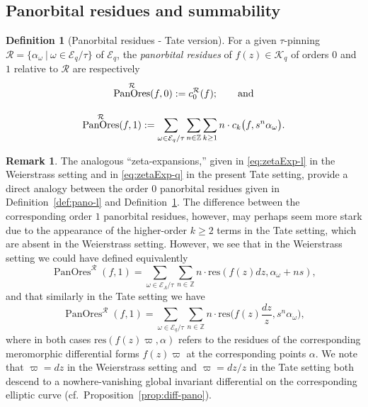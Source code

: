 \documentclass[preprint,12pt]{elsarticle}
\numberwithin{equation}{section} %
\theoremstyle{theorem}
\theoremstyle{definition}
\newtheorem{definition}[theorem]{Definition}
\newtheorem{remark}[theorem]{Remark}
\newcommand{\bk}{\mathcal{K}} %
\newcommand{\bkq}{\bk_{q}} %
\newcommand{\ec}{\mathcal{E}} %
\newcommand{\ecl}{\ec_{\Lambda}} %
\newcommand{\orbitl}{{\ecl/\tau}} %
\newcommand{\ecq}{\ec_{q}}
\newcommand{\orbitq}{{\ecq/\tau}} %
\newcommand{\Z}{\mathbb{Z}} %
\DeclareMathOperator{\pano}{PanOres}
\begin{document}
\subsection{Panorbital residues and summability}

\begin{definition}[Panorbital residues - Tate version] \label{def:pano-q} For a given $\tau$-pinning $\mathcal{R}=\{\alpha_\omega \ | \ \omega\in\orbitq\}$ of $\ecq$, the \emph{panorbital residues} of $f(z)\in\bkq$ of orders $0$ and $1$ relative to $\mathcal{R}$ are respectively
\begin{equation}\label{eq:pano-q-def}
    \begin{gathered}
        \pano^\mathcal{R}(f,0):=c_0^\mathcal{R}(f);\vphantom{\sum_A}\qquad \text{and}\\
    \pano^\mathcal{R}(f,1):=\sum_{\omega\in\orbitq}\sum_{n\in\mathbb{Z}} \sum_{k\geq 1} n\cdot c_k\bigl(f,s^n\alpha_\omega\bigr).
    \end{gathered}
\end{equation}
\end{definition}

\begin{remark}\label{rem:pano-wq-comparison} The analogous ``zeta-expansions,'' given in \eqref{eq:zetaExp-l} in the Weierstrass setting and in \eqref{eq:zetaExp-q} in the present Tate setting, provide a direct analogy between the order $0$ panorbital residues given in Definition~\ref{def:pano-l} and Definition~\ref{def:pano-q}. The difference between the corresponding order $1$ panorbital residues, however, may perhaps seem more stark due to the appearance of the higher-order $k\geq 2$ terms in the Tate setting, which are absent in the Weierstrass setting. However, we see that in the Weierstrass setting we could have defined equivalently \[\pano^\mathcal{R}(f,1)=\sum_{\omega\in\orbitl}\sum_{n\in\Z}n\cdot\mathrm{res}(f(z)dz,\alpha_\omega+ns),\] and that similarly in the Tate setting we have \[\pano^\mathcal{R}(f,1)=\sum_{\omega\in\orbitq}\sum_{n\in\Z}n\cdot\mathrm{res}\biggl(f(z)\frac{dz}{z},s^n\alpha_\omega\biggr),\] where in both cases $\mathrm{res}(f(z)\varpi,\alpha)$ refers to the residues of the corresponding meromorphic differential forms $f(z)\varpi$ at the corresponding points $\alpha$. We note that $\varpi=dz$ in the Weierstrass setting and $\varpi=dz/z$ in the Tate setting both descend to a nowhere-vanishing global invariant differential on the corresponding elliptic curve (cf.~Proposition~\ref{prop:diff-pano}).
\end{remark}
\end{document}
